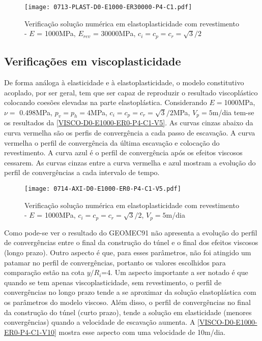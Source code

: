 \begin{figure}[H]
	\begin{center}
		\texttt{[image: 0713-PLAST-D0-E1000-ER30000-P4-C1.pdf]}
	\end{center}
	\caption{\label{PLAST-D0-E1000-ER30000-P4-C1}Verificação solução numérica em elastoplasticidade com revestimento - $E$ = 1000MPa, $E_{rev}$ = 30000MPa, $c_i=c_p=c_r=\sqrt{3}/2$}
\end{figure}

\subsection{Verificações em viscoplasticidade}

De forma análoga à elasticidade e à elastoplasticidade, o modelo constitutivo acoplado, por ser geral, tem que ser capaz de reproduzir o resultado viscoplástico colocando coesões elevadas na parte elastoplástica.  Considerando $E =$1000MPa, $\nu =$ 0.498MPa, $p_v = p_h = 4$MPa, $c_i=c_p=c_r = \sqrt{3}/2$MPa, $V_p = 5$m/dia tem-se os resultados da \autoref{VISCO-D0-E1000-ER0-P4-C1-V5}. As curvas cinzas abaixo da curva vermelha são os perfis de convergência a cada passo de escavação. A curva vermelha o perfil de convergência da última escavação e colocação do revestimento. A curva azul é o perfil de convergência após os efeitos viscosos cessarem. As curvas cinzas entre a curva vermelha e azul mostram a evolução do perfil de convergências a cada intervalo de tempo.
\begin{figure}[H]
	\begin{center}
		\texttt{[image: 0714-AXI-D0-E1000-ER0-P4-C1-V5.pdf]}
	\end{center}
	\caption{\label{VISCO-D0-E1000-ER0-P4-C1-V5}Verificação solução numérica em elastoplasticidade com revestimento - $E$ = 1000MPa, $c_i=c_p=c_r=\sqrt{3}/2$, $V_p=5$m/dia}
\end{figure}
Como pode-se ver o resultado do GEOMEC91 não apresenta a evolução do perfil de convergências entre o final da construção do túnel e o final dos efeitos viscosos (longo prazo). Outro aspecto é que, para esses parâmetros, não foi atingido um patamar no perfil de convergências, portanto os valores escolhidos para comparação estão na cota $y/R_i$=4. Um aspecto importante a ser notado é que quando se tem apenas viscoplasticidade, sem revestimento, o perfil de convergências no longo prazo tende a se aproximar da solução elastoplástica com os parâmetros do modelo viscoso. Além disso, o perfil de convergências no final da construção do túnel (curto prazo), tende a solução em elasticidade (menores convergências) quando a velocidade de escavação aumenta. A \autoref{VISCO-D0-E1000-ER0-P4-C1-V10} mostra esse aspecto com uma velocidade de 10m/dia.

